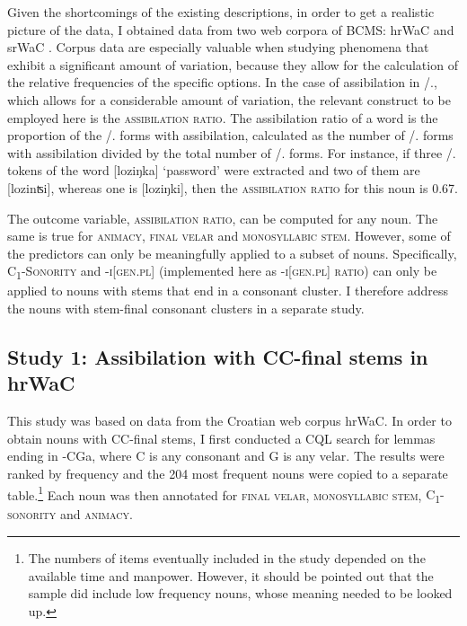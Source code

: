 \documentclass[output=paper,colorlinks,citecolor=brown]{langscibook}
\begin{document}
Given the shortcomings of the existing descriptions, in order to get a realistic picture of the data, I obtained data from two web corpora of BCMS: hrWaC and srWaC \citep{ljub-klub14}. Corpus data are especially valuable when studying phenomena that exhibit a significant amount of variation, because they allow for the calculation of the relative frequencies of the specific options. In the case of assibilation in {\DAT/\LOC.\SG}, which allows for a considerable amount of variation, the relevant construct to be employed here is the \textsc{assibilation ratio}. The assibilation ratio of a word is the proportion of the {\DAT/\LOC.\SG} forms with assibilation, calculated as the number of {\DAT/\LOC.\SG} forms with assibilation divided by the total number of {\DAT/\LOC.\SG} forms. For instance, if three {\DAT/\LOC.\SG} tokens of the word [{loziŋka}] `password' were extracted and two of them are [{lozinʦi}], whereas one is [{loziŋki}], then the \textsc{assibilation ratio} for this noun is 0.67. 

The outcome variable, \textsc{assibilation ratio}, can be computed for any noun. The same is true for \textsc{animacy}, \textsc{final velar} and \textsc{monosyllabic stem}. However, some of the predictors can only be meaningfully applied to a subset of nouns. Specifically, \textsc{C\textsubscript{1}-Sonority} and \textsc{\nobreakdash-i[gen.pl]} (implemented here as \textsc{\nobreakdash-i[gen.pl] ratio}) can only be applied to nouns with stems that end in a consonant cluster. I therefore address the nouns with stem-final consonant clusters in a separate study.

\subsection{Study 1: Assibilation with CC-final stems in hrWaC}

This study was based on data from the Croatian web corpus hrWaC. 
In order to obtain nouns with CC-final stems, I first conducted a CQL search for lemmas ending in -CGa, where C is any consonant and G is any velar. The results were ranked by frequency and the 204 most frequent nouns were copied to a separate table.\footnote{The numbers of items eventually included in the study depended on the available time and manpower. However, it should be pointed out that the sample did include low frequency nouns, whose meaning needed to be looked up.} Each noun was then annotated for \textsc{final velar}, \textsc{monosyllabic stem}, \textsc{C\textsubscript{1}-sonority} and \textsc{animacy}.
\end{document}
